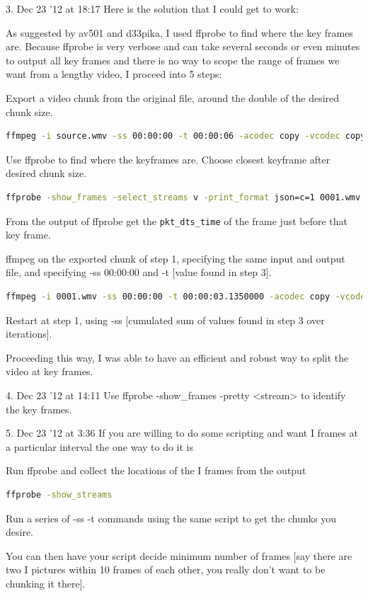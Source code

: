 \documentclass[letter,11pt,onecolumn]{book}
\begin{document}
3. Dec 23 '12 at 18:17
Here is the solution that I could get to work:

As suggested by av501 and d33pika, I used ffprobe to find where the key frames are. Because ffprobe is very verbose and can take several seconds or even minutes to output all key frames and there is no way to scope the range of frames we want from a lengthy video, I proceed into 5 steps:

    Export a video chunk from the original file, around the double of the desired chunk size.
\begin{lstlisting}[language=bash]
ffmpeg -i source.wmv -ss 00:00:00 -t 00:00:06 -acodec copy -vcodec copy -async 1 -y  0001.wmv
\end{lstlisting}
    Use ffprobe to find where the keyframes are. Choose closest keyframe after desired chunk size.
\begin{lstlisting}[language=bash]
ffprobe -show_frames -select_streams v -print_format json=c=1 0001.wmv
\end{lstlisting}
    From the output of ffprobe get the \texttt{pkt\_dts\_time} of the frame just before that key frame.

    ffmpeg on the exported chunk of step 1, specifying the same input and output file, and specifying -ss 00:00:00 and -t [value found in step 3].
\begin{lstlisting}[language=bash]
ffmpeg -i 0001.wmv -ss 00:00:00 -t 00:00:03.1350000 -acodec copy -vcodec copy -async 1 -y 0001.wmv
\end{lstlisting}
    Restart at step 1, using -ss [cumulated sum of values found in step 3 over iterations].

Proceeding this way, I was able to have an efficient and robust way to split the video at key frames.



4. Dec 23 '12 at 14:11
Use ffprobe -show\_frames -pretty <stream> to identify the key frames.


5. Dec 23 '12 at 3:36
If you are willing to do some scripting and want I frames at a particular interval the one way to do it is

Run ffprobe and collect the locations of the I frames from the output
\begin{lstlisting}[language=bash]
ffprobe -show_streams
\end{lstlisting}
Run a series of -ss -t commands using the same script to get the chunks you desire.

You can then have your script decide minimum number of frames [say there are two I pictures within 10 frames of each other, you really don't want to be chunking it there].
\end{document}
